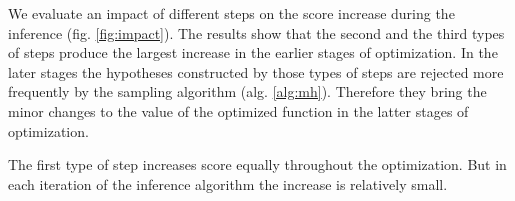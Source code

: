 We evaluate an impact of different steps on the score increase during the inference (fig. \ref{fig:impact}). The results show that the second and the third types of steps produce the largest increase in the earlier stages of optimization. In the later stages the hypotheses constructed by those types of steps are rejected more frequently by the sampling algorithm (alg. \ref{alg:mh}). Therefore they bring the minor changes to the value of the optimized function in the latter stages of optimization. 

The first type of step increases score equally throughout the optimization. But in each iteration of the inference algorithm the increase is relatively small.

\fi
